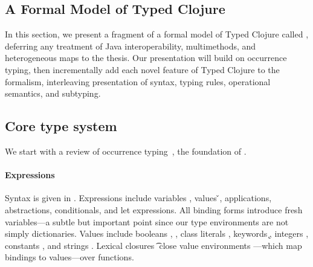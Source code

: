 \subsection{A Formal Model of Typed Clojure}
\label{sec:formal}

In this section, we present a fragment of a formal model of
Typed Clojure called \lambdatc{}, deferring any treatment
of Java interoperability, multimethods, and heterogeneous maps
to the thesis.
%
%
Our presentation will build on occurrence typing, then incrementally add each
novel feature of Typed Clojure to the formalism,
interleaving presentation of syntax, typing rules, operational semantics,
and subtyping.

\subsection{Core type system}
\label{sec:coretypesystem}

We start with a review of
occurrence typing~\cite{TF10}, the foundation of \lambdatc{}.

\paragraph{Expressions} Syntax is given in . Expressions \e{} 
include variables \x{}, values \v{},
applications, abstractions, conditionals, and let expressions.
All binding forms introduce fresh variables---a subtle but important point since our type environments
are not simply dictionaries.
Values include booleans \bool{}, \nil{}, class literals {\class{}}, keywords \k{},
integers {\nat{}},
constants {\const{}}, and strings \str{}. Lexical closures {\closure {\openv{}} {\abs {\x{}} {\t{}} {\e{}}}}
close value environments \openv{}---which map bindings to values---over functions.

